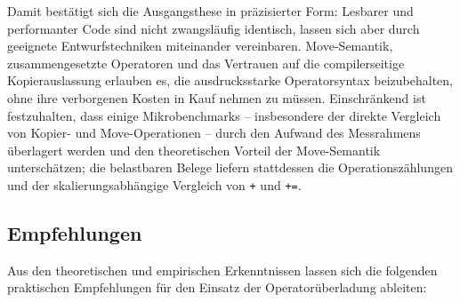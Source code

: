 \documentclass[10pt,a4paper]{article}
\begin{document}
Damit bestätigt sich die Ausgangsthese in präzisierter Form: Lesbarer und
performanter Code sind nicht zwangsläufig identisch, lassen sich aber durch
geeignete Entwurfstechniken miteinander vereinbaren. Move-Semantik,
zusammengesetzte Operatoren und das Vertrauen auf die compilerseitige
Kopierauslassung erlauben es, die ausdrucksstarke Operatorsyntax beizubehalten,
ohne ihre verborgenen Kosten in Kauf nehmen zu müssen. Einschränkend ist
festzuhalten, dass einige Mikrobenchmarks -- insbesondere der direkte Vergleich
von Kopier- und Move-Operationen -- durch den Aufwand des Messrahmens überlagert
werden und den theoretischen Vorteil der Move-Semantik unterschätzen; die
belastbaren Belege liefern stattdessen die Operationszählungen und der
skalierungsabhängige Vergleich von \texttt{+} und \texttt{+=}.
 
\subsection{Empfehlungen}
\label{sec:empfehlungen}
 
Aus den theoretischen und empirischen Erkenntnissen lassen sich die folgenden
praktischen Empfehlungen für den Einsatz der Operatorüberladung ableiten:
 
\end{document}
